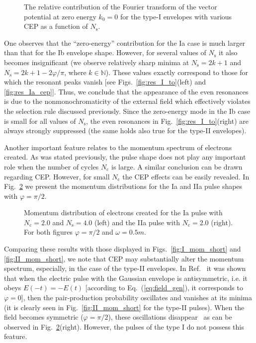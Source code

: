 \documentclass[preprint,aps,prd,showpacs,floatfix]{revtex4-1}
\begin{document}
%
\begin{figure}[h]
\caption{The relative contribution of the Fourier transform of the vector potential at zero energy $k_0 = 0$ for the type-I envelopes with various CEP as a function of $N_\text{s}$.}
\label{fig:fourier}
\end{figure}
%
One observes that the ``zero-energy'' contribution for the Ia case is much larger than that for the Ib envelope shape. However, for several values of $N_\text{s}$ it also becomes insignificant (we observe relatively sharp minima at $N_\text{s} = 2k + 1$ and $N_\text{s} = 2k + 1 - 2\varphi/\pi$, where $k \in \mathbb{N}$). These values exactly correspond to those for which the resonant peaks vanish [see Figs.~\ref{fig:res_I_to}(left) and \ref{fig:res_Ia_cep}]. Thus, we conclude that the appearance of the even resonances is due to the nonmonochromaticity of the external field which effectively violates the selection rule discussed previously. Since the zero-energy mode in the Ib case is small for all values of $N_\text{s}$, the even resonances in Fig.~\ref{fig:res_I_to}(right) are always strongly suppressed (the same holds also true for the type-II envelopes).

\indent Another important feature relates to the momentum spectrum of electrons created. As was stated previously, the pulse shape does not play any important role when the number of cycles $N_\text{c}$ is large. A similar conclusion can be drawn regarding CEP. However, for small $N_\text{c}$ the CEP effects can be easily revealed. In Fig.~\ref{fig:mom_cep} we present the momentum distributions for the Ia and IIa pulse shapes with $\varphi = \pi/2$.
%
\begin{figure}[h]
\caption{Momentum distribution of electrons created for the Ia pulse with $N_\text{c} = 2.0$ and $N_\text{s} = 4.0$ (left) and the IIa pulse with $N_\text{c} = 2.0$ (right). For both figures $\varphi = \pi/2$ and $\omega = 0.5m$.}
\label{fig:mom_cep}
\end{figure}
%
Comparing these results with those displayed in Figs.~\ref{fig:I_mom_short} and \ref{fig:II_mom_short}, we note that CEP may substantially alter the momentum spectrum, especially, in the case of the type-II envelopes. In Ref.~\cite{hebenstreit_prl_2009} it was shown that when the electric pulse with the Gaussian envelope is antisymmetric, i.e. it obeys $E(-t) = -E(t)$ [according to Eq.~(\ref{eq:field_gen}), it corresponds to $\varphi = 0$], then the pair-production probability oscillates and vanishes at its minima (it is clearly seen in Fig.~\ref{fig:II_mom_short} for the type-II pulses). When the field becomes symmetric ($\varphi = \pi/2$), these oscillations disappear~\cite{hebenstreit_prl_2009} as can be observed in Fig.~\ref{fig:mom_cep}(right). However, the pulses of the type I do not possess this feature.
\end{document}
